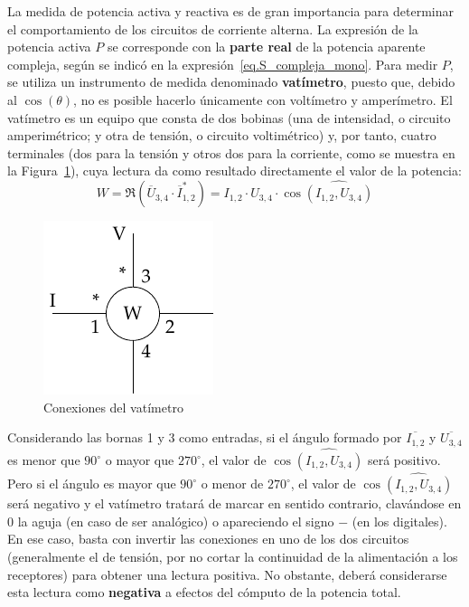 La medida de potencia activa y reactiva es de gran importancia para
determinar el comportamiento de los circuitos de corriente alterna. La
expresión de la potencia activa $P$ se corresponde con la
\textbf{parte real} de la potencia aparente compleja, según se indicó
en la expresión~\eqref{eq.S_compleja_mono}. Para medir $P$, se utiliza
un instrumento de medida denominado \textbf{vatímetro}, puesto que,
debido al $\cos(\theta)$, no es posible hacerlo únicamente con
voltímetro y amperímetro. El vatímetro es un equipo que consta de dos
bobinas (una de intensidad, o circuito amperimétrico; y otra de
tensión, o circuito voltimétrico) y, por tanto, cuatro terminales (dos
para la tensión y otros dos para la corriente, como se muestra en la
Figura~\ref{fig.vatimetro_2}), cuya lectura da como resultado
directamente el valor de la potencia:
\begin{equation*}
  W=\Re(\overline{U}_{3,4} \cdot \overline{I}_{1,2}^*)=I_{1,2}\cdot U_{3,4}\cdot \cos\widehat{(I_{1,2}, U_{3,4})}
\end{equation*}%
	
\begin{figure}[H]
  \centering \includegraphics{../figs/vatimetro_2.pdf}
  \caption{Conexiones del vatímetro}
  \label{fig.vatimetro_2}
\end{figure}
Considerando las bornas 1 y 3 como entradas, si el ángulo formado por
$\overline{I_{1,2}}$ y $\overline{U_{3,4}}$ es menor que $90^\circ$ o
mayor que $270^\circ$, el valor de $\cos\widehat{(I_{1,2}, U_{3,4})}$
será positivo. Pero si el ángulo es mayor que $90^\circ$ o menor de
$270^\circ$, el valor de $\cos\widehat{(I_{1,2}, U_{3,4})}$ será
negativo y el vatímetro tratará de marcar en sentido contrario,
clavándose en $0$ la aguja (en caso de ser analógico) o apareciendo el
signo $-$ (en los digitales). En ese caso, basta con invertir las
conexiones en uno de los dos circuitos (generalmente el de tensión,
por no cortar la continuidad de la alimentación a los receptores) para
obtener una lectura positiva. No obstante, deberá considerarse esta
lectura como \textbf{negativa} a efectos del cómputo de la potencia
total.
	
